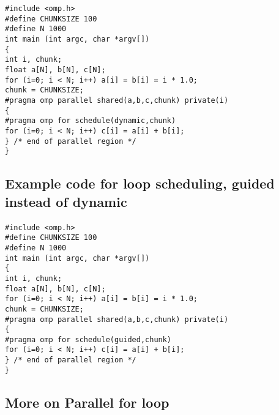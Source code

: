 \begin{verbatim}
#include <omp.h>
#define CHUNKSIZE 100
#define N 1000
int main (int argc, char *argv[])
{
int i, chunk;
float a[N], b[N], c[N];
for (i=0; i < N; i++) a[i] = b[i] = i * 1.0;
chunk = CHUNKSIZE;
#pragma omp parallel shared(a,b,c,chunk) private(i)
{
#pragma omp for schedule(dynamic,chunk)
for (i=0; i < N; i++) c[i] = a[i] + b[i];
} /* end of parallel region */
}

\end{verbatim}



\subsection*{Example code for loop scheduling, guided instead of dynamic}

\paragraph{}
















\begin{verbatim}
#include <omp.h>
#define CHUNKSIZE 100
#define N 1000
int main (int argc, char *argv[])
{
int i, chunk;
float a[N], b[N], c[N];
for (i=0; i < N; i++) a[i] = b[i] = i * 1.0;
chunk = CHUNKSIZE;
#pragma omp parallel shared(a,b,c,chunk) private(i)
{
#pragma omp for schedule(guided,chunk)
for (i=0; i < N; i++) c[i] = a[i] + b[i];
} /* end of parallel region */
}

\end{verbatim}



\subsection*{More on Parallel for loop}

